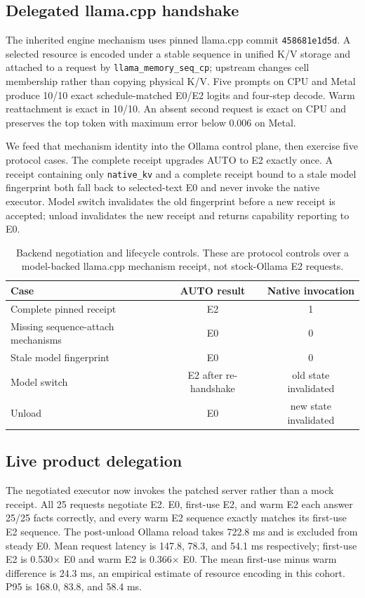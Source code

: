 \documentclass[10pt]{article}
\begin{document}
\subsection{Delegated llama.cpp handshake}

The inherited engine mechanism uses pinned llama.cpp commit
\texttt{458681e1d5d}. A selected resource is encoded under a stable sequence in
unified K/V storage and attached to a request by
\texttt{llama\_memory\_seq\_cp}; upstream changes cell membership rather than
copying physical K/V. Five prompts on CPU and Metal produce 10/10 exact
schedule-matched E0/E2 logits and four-step decode. Warm reattachment is exact
in 10/10. An absent second request is exact on CPU and preserves the top token
with maximum error below 0.006 on Metal.

We feed that mechanism identity into the Ollama control plane, then exercise
five protocol cases. The complete receipt upgrades AUTO to E2 exactly once.
A receipt containing only \texttt{native\_kv} and a complete receipt bound to a
stale model fingerprint both fall back to selected-text E0 and never invoke the
native executor. Model switch invalidates the old fingerprint before a new
receipt is accepted; unload invalidates the new receipt and returns capability
reporting to E0.

\begin{table}[H]
\centering\small
\caption{Backend negotiation and lifecycle controls. These are protocol
controls over a model-backed llama.cpp mechanism receipt, not stock-Ollama E2
requests.}
\begin{tabular}{lcc}
\toprule Case & AUTO result & Native invocation\\
\midrule
Complete pinned receipt & E2 & 1\\
Missing sequence-attach mechanisms & E0 & 0\\
Stale model fingerprint & E0 & 0\\
Model switch & E2 after re-handshake & old state invalidated\\
Unload & E0 & new state invalidated\\
\bottomrule
\end{tabular}
\label{tab:backend-handshake}
\end{table}

\subsection{Live product delegation}

The negotiated executor now invokes the patched server rather than a mock
receipt. All 25 requests negotiate E2. E0, first-use E2, and warm E2 each answer
25/25 facts correctly, and every warm E2 sequence exactly matches its first-use
E2 sequence. The post-unload Ollama reload takes 722.8 ms and is excluded from
steady E0. Mean request latency is 147.8, 78.3, and 54.1 ms respectively;
first-use E2 is 0.530$\times$ E0 and warm E2 is 0.366$\times$ E0. The mean
first-use minus warm difference is 24.3 ms, an empirical estimate of resource
encoding in this cohort. P95 is 168.0, 83.8, and 58.4 ms.
\end{document}
